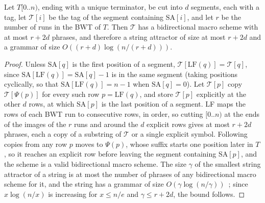 \begin{observation}
\label{obs:grammar}
Let $T[0..n)$, ending with a unique terminator, be cut into $d$ segments, each with a tag, let $\mathcal{T}[i]$ be the tag of the segment containing $\mathrm{SA}[i]$, and let $r$ be the number of runs in the BWT of $T$.
Then $\mathcal{T}$ has a bidirectional macro scheme with at most $r + 2d$ phrases, and therefore a string attractor of size at most $r + 2d$ and a grammar of size $O((r + d) \log (n / (r + d)))$.
\end{observation}

\begin{proof}
Unless $\mathrm{SA}[q]$ is the first position of a segment, $\mathcal{T}[\mathrm{LF}(q)] = \mathcal{T}[q]$, since $\mathrm{SA}[\mathrm{LF}(q)] = \mathrm{SA}[q] - 1$ is in the same segment (taking positions cyclically, so that $\mathrm{SA}[\mathrm{LF}(q)] = n - 1$ when $\mathrm{SA}[q] = 0$).
Let $\mathcal{T}[p]$ copy $\mathcal{T}[\Psi(p)]$ for every such row $p = \mathrm{LF}(q)$, and store $\mathcal{T}[p]$ explicitly at the other $d$ rows, at which $\mathrm{SA}[p]$ is the last position of a segment.
LF maps the rows of each BWT run to consecutive rows, in order, so cutting $[0..n)$ at the ends of the images of the $r$ runs and around the $d$ explicit rows gives at most $r + 2d$ phrases, each a copy of a substring of $\mathcal{T}$ or a single explicit symbol.
Following copies from any row $p$ moves to $\Psi(p)$, whose suffix starts one position later in $T$, so it reaches an explicit row before leaving the segment containing $\mathrm{SA}[p]$, and the scheme is a valid bidirectional macro scheme.
The size $\gamma$ of the smallest string attractor of a string is at most the number of phrases of any bidirectional macro scheme for it, and the string has a grammar of size $O(\gamma \log (n/\gamma))$~\cite{KP18}; since $x \log (n/x)$ is increasing for $x \leq n/e$ and $\gamma \leq r + 2d$, the bound follows.
\end{proof}

